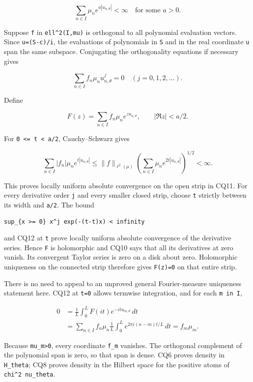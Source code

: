 \[
\sum_{n\in I}\mu_ne^{a|u_{n,\theta}|}<\infty
\quad\text{for some }a>0.
\tag{CQ9}
\]

Suppose \texttt{f} in \texttt{ell\^{}2(I,mu)} is orthogonal to all polynomial evaluation vectors. Since \texttt{u=(S-c)/i}, the evaluations of polynomials in \texttt{S} and in the real coordinate \texttt{u} span the same subspace. Conjugating the orthogonality equations if necessary gives

\[
\sum_{n\in I}f_n\mu_nu_{n,\theta}^{j}=0
\quad(j=0,1,2,\ldots).
\tag{CQ10}
\]

Define

\[
F(z)=\sum_{n\in I}f_n\mu_ne^{zu_{n,\theta}},
\qquad |\Re z|<a/2.
\tag{CQ11}
\]

For \texttt{0\ \textless{}=\ t\ \textless{}\ a/2}, Cauchy--Schwarz gives

\[
\sum_{n\in I}|f_n|\mu_ne^{t|u_{n,\theta}|}
\le\|f\|_{\ell^2(\mu)}
\left(\sum_{n\in I}\mu_ne^{2t|u_{n,\theta}|}\right)^{1/2}<\infty.
\tag{CQ12}
\]

This proves locally uniform absolute convergence on the open strip in CQ11. For every derivative order \texttt{j} and every smaller closed strip, choose \texttt{t\textquotesingle{}} strictly between its width and \texttt{a/2}. The bound

\texttt{sup\_\{x\ \textgreater{}=\ 0\}\ x\^{}j\ exp(-(t\textquotesingle{}-t)x)\ \textless{}\ infinity}

and CQ12 at \texttt{t\textquotesingle{}} prove locally uniform absolute convergence of the derivative series. Hence \texttt{F} is holomorphic and CQ10 says that all its derivatives at zero vanish. Its convergent Taylor series is zero on a disk about zero. Holomorphic uniqueness on the connected strip therefore gives \texttt{F(z)=0} on that entire strip.

There is no need to appeal to an unproved general Fourier-measure uniqueness statement here. CQ12 at \texttt{t=0} allows termwise integration, and for each \texttt{m\ in\ I},

\[
\begin{aligned}
0&=\frac1L\int_0^L F(it)e^{-it u_{m,\theta}}\,dt\\
&=\sum_{n\in I}f_n\mu_n
\frac1L\int_0^L e^{2\pi i(n-m)t/L}\,dt
=f_m\mu_m.
\end{aligned}
\tag{CQ13}
\]

Because \texttt{mu\_m\textgreater{}0}, every coordinate \texttt{f\_m} vanishes. The orthogonal complement of the polynomial span is zero, so that span is dense. CQ6 proves density in \texttt{H\_theta}; CQ8 proves density in the Hilbert space for the positive atoms of \texttt{\textbar{}chi\textbar{}\^{}2\ nu\_theta}.

